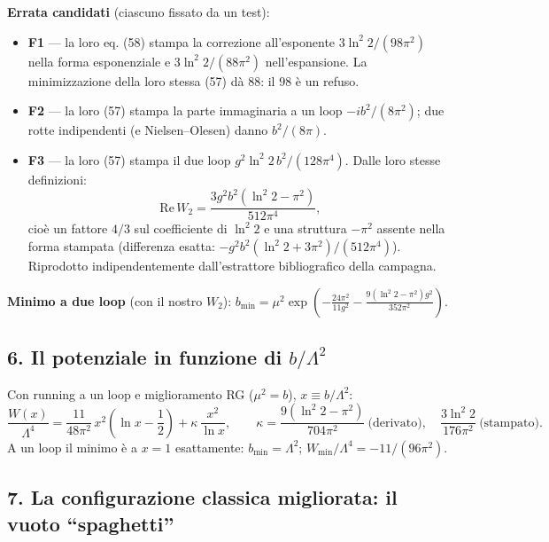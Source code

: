 \documentclass[
]{article}
\providecommand{\tightlist}{%
  \setlength{\itemsep}{0pt}\setlength{\parskip}{0pt}}
\begin{document}
\textbf{Errata candidati} (ciascuno fissato da un test):

\begin{itemize}
\tightlist
\item
  \textbf{F1} --- la loro eq. (58) stampa la correzione all'esponente
  \(3\ln^2 2/(98\pi^2)\) nella forma esponenziale e
  \(3\ln^2 2/(88\pi^2)\) nell'espansione. La minimizzazione della loro
  stessa (57) dà \(88\): il \(98\) è un refuso.
\item
  \textbf{F2} --- la loro (57) stampa la parte immaginaria a un loop
  \(-i b^2/(8\pi^2)\); due rotte indipendenti (e Nielsen--Olesen) danno
  \(b^2/(8\pi)\).
\item
  \textbf{F3} --- la loro (57) stampa il due loop
  \(g^2\ln^2 2\, b^2/(128\pi^4)\). Dalle loro stesse definizioni:
  \[\mathrm{Re}\,W_2 = \frac{3g^2 b^2 (\ln^2 2 - \pi^2)}{512\pi^4},\]
  cioè un fattore \(4/3\) sul coefficiente di \(\ln^2 2\) e una
  struttura \(-\pi^2\) assente nella forma stampata (differenza esatta:
  \(-g^2b^2(\ln^2 2 + 3\pi^2)/(512\pi^4)\)). Riprodotto
  indipendentemente dall'estrattore bibliografico della campagna.
\end{itemize}

\textbf{Minimo a due loop} (con il nostro \(W_2\)):
\(b_{\min} = \mu^2 \exp\left(-\frac{24\pi^2}{11g^2} - \frac{9(\ln^2 2 - \pi^2)g^2}{352\pi^2}\right)\).

\hypertarget{il-potenziale-in-funzione-di-blambda2}{%
\subsection{\texorpdfstring{6. Il potenziale in funzione di
\(b/\Lambda^2\)}{6. Il potenziale in funzione di b/\textbackslash Lambda\^{}2}}\label{il-potenziale-in-funzione-di-blambda2}}

Con running a un loop e miglioramento RG (\(\mu^2 = b\)),
\(x \equiv b/\Lambda^2\):
\[\frac{W(x)}{\Lambda^4} = \frac{11}{48\pi^2}\,x^2\left(\ln x - \frac12\right) + \kappa\,\frac{x^2}{\ln x},\qquad \kappa = \frac{9(\ln^2 2 - \pi^2)}{704\pi^2}\ \text{(derivato)},\quad \frac{3\ln^2 2}{176\pi^2}\ \text{(stampato)}.\]
A un loop il minimo è a \(x = 1\) esattamente: \(b_{\min} = \Lambda^2\);
\(W_{\min}/\Lambda^4 = -11/(96\pi^2)\).

\hypertarget{la-configurazione-classica-migliorata-il-vuoto-spaghetti}{%
\subsection{7. La configurazione classica migliorata: il vuoto
``spaghetti''}\label{la-configurazione-classica-migliorata-il-vuoto-spaghetti}}
\end{document}
